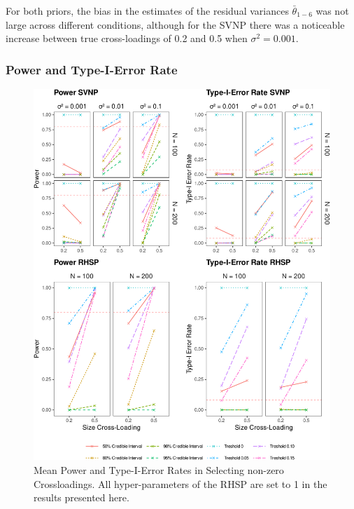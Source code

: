 \documentclass[
  man, donotrepeattitle,floatsintext]{apa6}
\begin{document}
For both priors, the bias in the estimates of the residual variances \(\bar{\theta}_{1-6}\) was not large across different conditions, although for the SVNP there was a noticeable increase between true cross-loadings of 0.2 and 0.5 when \(\sigma^2 = 0.001\).

\hypertarget{power-and-type-i-error-rate-1}{%
\subsubsection{Power and Type-I-Error Rate}\label{power-and-type-i-error-rate-1}}

\begin{figure}
\centering
\includegraphics{JMBKoch_thesis_files/figure-latex/unnamed-chunk-6-1.pdf}
\caption{\label{fig:unnamed-chunk-6}Mean Power and Type-I-Error Rates in Selecting non-zero Crossloadings. All hyper-parameters of the RHSP are set to 1 in the results presented here.}
\end{figure}
\end{document}
